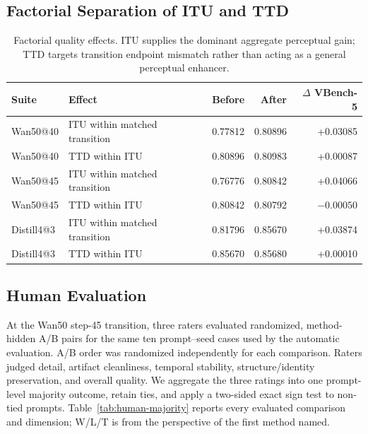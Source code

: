 \documentclass[letterpaper]{article}
\begin{document}
\subsection{Factorial Separation of ITU and TTD}

\begin{table}[t]
  \centering
  \small
  \setlength{\tabcolsep}{4pt}
  \begin{tabular}{llrrr}
    \toprule
    Suite & Effect & Before & After & \(\Delta\) VBench-5 \\
    \midrule
    Wan50@40 & ITU within matched transition & 0.77812 & 0.80896 & +0.03085 \\
    Wan50@40 & TTD within ITU & 0.80896 & 0.80983 & +0.00087 \\
    Wan50@45 & ITU within matched transition & 0.76776 & 0.80842 & +0.04066 \\
    Wan50@45 & TTD within ITU & 0.80842 & 0.80792 & \(-0.00050\) \\
    Distill4@3 & ITU within matched transition & 0.81796 & 0.85670 & +0.03874 \\
    Distill4@3 & TTD within ITU & 0.85670 & 0.85680 & +0.00010 \\
    \bottomrule
  \end{tabular}
  \caption{Factorial quality effects.  ITU supplies the dominant aggregate
  perceptual gain; TTD targets transition endpoint mismatch rather than acting
  as a general perceptual enhancer.}
  \label{tab:factorial}
\end{table}

\FloatBarrier
\subsection{Human Evaluation}

At the Wan50 step-45 transition, three raters evaluated randomized,
method-hidden A/B pairs for the same ten prompt--seed cases used by the
automatic evaluation.  A/B order was randomized independently for each
comparison.  Raters judged detail, artifact cleanliness, temporal stability,
structure/identity preservation, and overall quality.  We aggregate the three
ratings into one prompt-level majority outcome, retain ties, and apply a
two-sided exact sign test to non-tied prompts.  Table~\ref{tab:human-majority}
reports every evaluated comparison and dimension; W/L/T is from the
perspective of the first method named.
\end{document}
